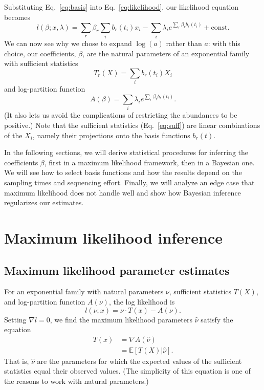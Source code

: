 \documentclass[12pt, letterpaper]{article}
\begin{document}
Substituting Eq.~\ref{eq:basis} into Eq.~\ref{eq:likelihood}, our likelihood equation becomes
\begin{equation}
    l(\beta; x, \lambda) = \sum_r \beta_r \sum_i b_r(t_i) x_i - \sum_i \lambda_i e^{\sum_r \beta_r b_r(t_i)} + \text{const.}
\end{equation}
We can now see why we chose to expand $\log(a)$ rather than $a$:
with this choice, our coefficients, $\beta$, are the natural parameters of an exponential family with sufficient statistics
\begin{equation}
    T_r(X) = \sum_i b_r(t_i) X_i
    \label{eq:suff}
\end{equation}
and log-partition function
\begin{equation}
    A(\beta) = \sum_i \lambda_i e^{\sum_r \beta_r b_r(t_i)}.
\end{equation}
(It also lets us avoid the complications of restricting the abundances to be positive.)
Note that the sufficient statistics (Eq.~\ref{eq:suff}) are linear combinations of the $X_i$, namely their projections onto the basis functions $b_r(t)$.

In the following sections, we will derive statistical procedures for inferring the coefficients $\beta$, first in a maximum likelihood framework, then in a Bayesian one.
We will see how to select basis functions and how the results depend on the sampling times and sequencing effort.
Finally, we will analyze an edge case that maximum likelihood does not handle well and show how Bayesian inference regularizes our estimates.

\section{Maximum likelihood inference}

\subsection{Maximum likelihood parameter estimates}

For an exponential family with natural parameters $\nu$, sufficient statistics $T(X)$, and log-partition function $A(\nu)$, the log likelihood is
\begin{equation}
    l(\nu; x) = \nu \cdot T(x) - A(\nu).
\end{equation}
Setting $\nabla l = 0$, we find the maximum likelihood parameters $\hat{\nu}$ satisfy the equation
\begin{align}
    T(x) &= \nabla A(\hat{\nu}) \\
         &= \mathbb{E}\left[T(X)|\hat{\nu}\right].
\end{align}
That is, $\hat{\nu}$ are the parameters for which the expected values of the sufficient statistics equal their observed values.
(The simplicity of this equation is one of the reasons to work with natural parameters.)
\end{document}
